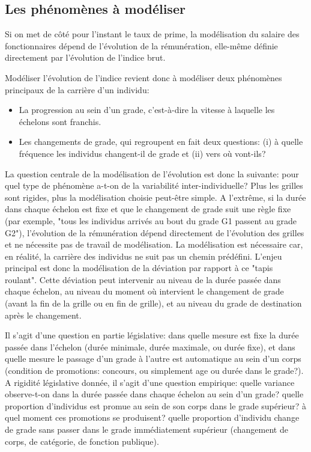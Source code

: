 \documentclass[11pt,a4paper]{article}
\begin{document}
\subsection*{Les phénomènes à modéliser}

Si on met de côté pour l'instant le taux de prime, la modélisation du salaire des fonctionnaires dépend de l'évolution de la rémunération, elle-même définie directement par l'évolution de l'indice brut. 

Modéliser l'évolution de l'indice revient donc à modéliser deux phénomènes principaux de la carrière d'un individu: 
\begin{itemize}[leftmargin=1cm ,parsep=0cm,itemsep=0cm,topsep=0cm] 
\item La progression au sein d'un grade, c'est-à-dire la vitesse à laquelle les échelons sont franchis. 
\item Les changements de grade, qui regroupent en fait deux questions: (i) à quelle fréquence les individus changent-il de grade et (ii) vers où vont-ils? 
\end{itemize} 

\vspace{0.2cm}



La question centrale de la modélisation de l'évolution est donc la suivante: pour quel type de phénomène a-t-on de la variabilité inter-individuelle? Plus les grilles sont rigides, plus la modélisation choisie peut-être simple. A l'extrême, si la durée dans chaque échelon est fixe et que le changement de grade suit une règle fixe (par exemple, "tous les individus arrivés au bout du grade G1 passent au grade G2"), l'évolution de la rémunération dépend directement de l'évolution des grilles et ne nécessite pas de travail de modélisation. La modélisation est nécessaire car, en réalité, la carrière des individus ne suit pas un chemin prédéfini. L'enjeu principal est donc la modélisation de la déviation par rapport à ce "tapis roulant". Cette déviation peut intervenir au niveau de la durée passée dans chaque échelon, au niveau du moment où intervient le changement de grade (avant la fin de la grille ou en fin de grille), et au niveau du grade de destination après le changement. 

Il s'agit d'une question en partie législative: dans quelle mesure est fixe la durée passée dans l'échelon (durée minimale, durée maximale, ou durée fixe), et dans quelle mesure le passage d'un grade à l'autre est automatique au sein d'un corps (condition de promotions: concours, ou simplement age ou durée dans le grade?). A rigidité législative donnée, il s'agit d'une question empirique: quelle variance observe-t-on dans la durée passée dans chaque échelon au sein d'un grade? quelle proportion d'individus est promue au sein de son corps dans le grade supérieur? à quel moment ces promotions se produisent? quelle proportion d'individu change de grade sans passer dans le grade immédiatement supérieur (changement de corps, de catégorie, de fonction publique). 
\end{document}
